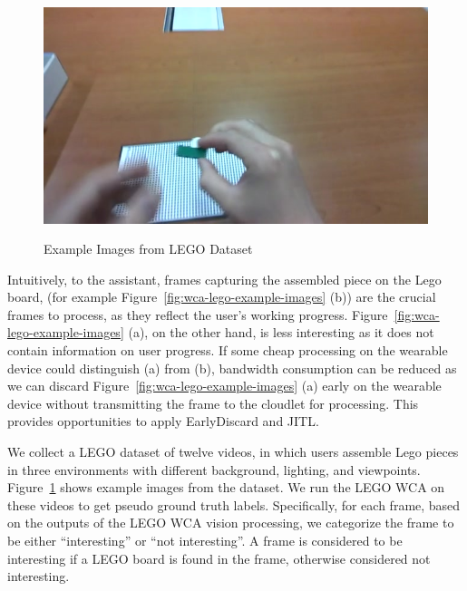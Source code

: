 \begin{figure}
\begin{minipage}[]{0.31\linewidth}
\end{minipage}
\begin{minipage}[]{0.31\linewidth}
\centering
\includegraphics[width=\linewidth]{FIGS/lego-dataset-3}\\
\end{minipage}
\caption{Example Images from LEGO Dataset}
\label{fig:wca-lego-dataset}
\end{figure}

Intuitively, to the assistant, frames capturing the assembled piece on the Lego
board, (for example Figure~\ref{fig:wca-lego-example-images} (b)) are the
crucial frames to process, as they reflect the user's working progress.
Figure~\ref{fig:wca-lego-example-images} (a), on the other hand, is less
interesting as it does not contain information on user progress. If some cheap
processing on the wearable device could distinguish
(a) from (b), bandwidth consumption can be
reduced as we can discard Figure~\ref{fig:wca-lego-example-images} (a) early on
the wearable device without transmitting the frame to the cloudlet for processing.
This provides opportunities to apply EarlyDiscard and JITL.

We collect a LEGO dataset of twelve videos, in which users assemble Lego pieces
in three environments with different background, lighting, and viewpoints.
Figure~\ref{fig:wca-lego-dataset} shows example images from the dataset. We run
the LEGO WCA on these videos to get pseudo ground truth labels. Specifically,
for each frame, based on the outputs of the LEGO WCA vision processing, we
categorize the frame to be either ``interesting'' or ``not interesting''. A
frame is considered to be interesting if a LEGO board is found in the frame,
otherwise considered not interesting. 

